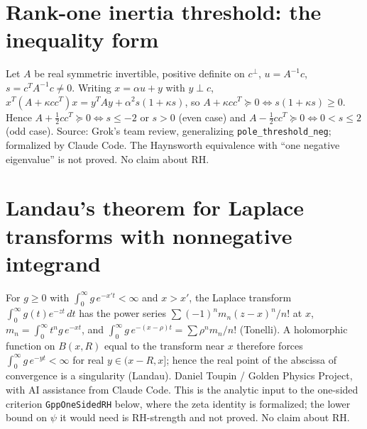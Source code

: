\documentclass{report}
\theoremstyle{definition}
\begin{document}
\begin{itemize}
\begin{itemize}
\section{Rank-one inertia threshold: the inequality form}
Let $A$ be real symmetric invertible, positive definite on $c^\perp$, $u=A^{-1}c$, $s=c^TA^{-1}c\ne0$. Writing $x=\alpha u+y$ with $y\perp c$,
$x^T(A+\kappa cc^T)x=y^TAy+\alpha^2s(1+\kappa s)$, so $A+\kappa cc^T\succeq0\iff s(1+\kappa s)\ge0$. Hence $A+\tfrac12cc^T\succeq0\iff s\le-2$ or $s>0$
(even case) and $A-\tfrac12cc^T\succeq0\iff0<s\le2$ (odd case). Source: Grok's team review, generalizing \texttt{pole\_threshold\_neg};
formalized by Claude Code. The Haynsworth equivalence with ``one negative eigenvalue'' is not proved. No claim about RH.
\section{Landau's theorem for Laplace transforms with nonnegative integrand}
For $g\ge0$ with $\int_0^\infty g\,e^{-x't}<\infty$ and $x>x'$, the Laplace transform $\int_0^\infty g(t)e^{-zt}\,dt$ has the power series
$\sum(-1)^nm_n(z-x)^n/n!$ at $x$, $m_n=\int_0^\infty t^ng\,e^{-xt}$, and $\int_0^\infty g\,e^{-(x-\rho)t}=\sum\rho^nm_n/n!$ (Tonelli). A holomorphic
function on $B(x,R)$ equal to the transform near $x$ therefore forces $\int_0^\infty g\,e^{-yt}<\infty$ for real $y\in(x-R,x]$; hence the real
point of the abscissa of convergence is a singularity (Landau). Daniel Toupin / Golden Physics Project, with AI assistance from Claude Code.
This is the analytic input to the one-sided criterion \texttt{GppOneSidedRH} below, where the zeta identity is formalized; the lower
bound on $\psi$ it would need is RH-strength and not proved.
No claim about RH.


\end{itemize}
\end{itemize}
\end{document}
